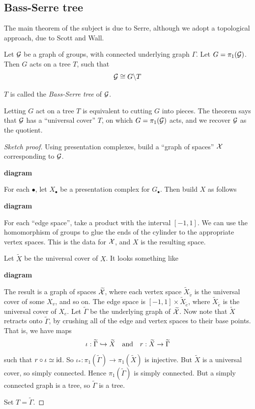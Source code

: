 \documentclass{article}
\begin{document}
\lec

\subsection{Bass-Serre tree}

The main theorem of the subject is due to Serre, although we adopt a topological approach, due to Scott and Wall.

\begin{theorem}
     Let \(\mathcal{G}\) be a graph of groups, with connected underlying graph \(\Gamma\). Let \(G = \pi_1(\mathcal{G})\). Then \(G\) acts on a tree \(T\), such that
    \[\mathcal{G} \cong G \backslash T\]
\end{theorem}

\(T\) is called the \emph{Bass-Serre tree} of \(\mathcal{G}\).

\begin{remark}
    Letting \(G\) act on a tree \(T\) is equivalent to cutting \(G\) into pieces. The theorem says that \(\mathcal{G}\) has a ``universal cover'' \(T\), on which \(G = \pi_1(\mathcal{G})\) acts, and we recover \(\mathcal{G}\) as the quotient. 
\end{remark}

\begin{proof}
    [Sketch proof] Using presentation complexes, build a ``graph of spaces'' \(\mathcal{X}\) corresponding to \(\mathcal{G}\).

    \textbf{diagram}

    For each \(\bullet\), let \(X_\bullet\) be a presentation complex for \(G_\bullet\). Then build \(X\) as follows

    \textbf{diagram}

    For each ``edge space'', take a product with the interval \([-1, 1]\). We can use the homomorphism of groups to glue the ends of the cylinder to the appropriate vertex spaces. This is the data for \(\mathcal{X}\), and \(X\) is the resulting space.

    Let \(\widetilde X\) be the universal cover of \(X\). It looks something like
    
    \textbf{diagram}

    The result is a graph of spaces \(\widetilde {\mathcal{X}}\), where each vertex space \(\widetilde X_{\widetilde v}\) is the universal cover of some \(X_v\), and so on. The edge space is \([-1, 1] \times \widetilde X_{\widetilde e}\), where \(\widetilde X_{\widetilde e}\) is the universal cover of \(X_e\). Let \(\widetilde \Gamma\) be the underlying graph of \(\widetilde {\mathcal{X}}\). Now note that \(\widetilde X\) retracts onto \(\widetilde \Gamma\), by crushing all of the edge and vertex spaces to their base points. That is, we have maps
    \[\iota : \widetilde \Gamma \inj \widetilde X \qqtext{and} r : \widetilde X \to \widetilde \Gamma\]
    such that \(r \circ \iota \simeq \operatorname{id}\). So \(\iota_* : \pi_1(\widetilde\Gamma) \to \pi_1(\widetilde X)\) is injective. But \(\widetilde X\) is a universal cover, so simply connected. Hence \(\pi_1(\widetilde \Gamma)\) is simply connected. But a simply connected graph is a tree, so \(\widetilde \Gamma\) is a tree.

    Set \(T = \widetilde \Gamma\).
\end{proof}
\end{document}
